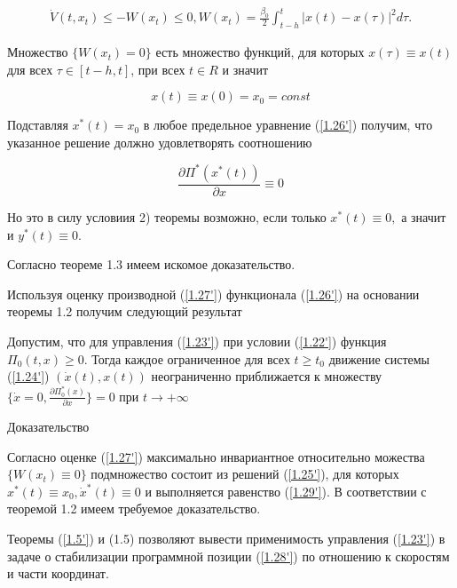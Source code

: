 \begin{equation} \label{1.27'}
	\begin{array}{c}
	\displaystyle \dot V(t, x_t) \le - W(x_t) \le 0, W(x_t) = \frac{\beta_0}{2} \int_{t - h}^{t} \left| x(t) - x(\tau) \right| ^ 2 d \tau.
	\end{array}
\end{equation}

Множество $\{ W(x_t) = 0 \}$ есть множество функций, для которых $x(\tau) \equiv x(t)$ для всех $\tau \in [t - h, t]$, при всех $t \in R$ и значит 

\begin{equation} \label{1.28'}
x(t) \equiv x(0) = x_0 = const
\end{equation}

Подставляя $x^{*}(t) = x_0$ в любое предельное уравнение (\ref{1.26'}) получим, что указанное решение должно удовлетворять соотношению 

\begin{equation} \label{1.29'}
\frac{\partial \Pi^{*} (x^{*} (t))}{\partial x} \equiv 0
\end{equation}

Но это в силу условиия 2) теоремы возможно, если только $x^{*} (t) \equiv 0,$ а значит и $y^{*}(t) \equiv 0.$

Согласно теореме 1.3 имеем искомое доказательство.

Используя оценку производной (\ref{1.27'}) функционала (\ref{1.26'}) на основании теоремы 1.2 получим следующий результат

\begin{theorem}\label{t-1.7}
Допустим, что для управления (\ref{1.23'}) при условии (\ref{1.22'}) функция $\Pi_0 (t, x) \ge 0$. Тогда каждое ограниченное для всех $t \ge t_0$ движение системы (\ref{1.24'}) $(\dot x(t), x(t))$ неограниченно приближается к множеству $ \lbrace \dot x = 0, \frac{\partial \Pi_0^{*} (x)}{\partial x} \rbrace = 0$ при $t \to + \infty$
\end{theorem}

Доказательство

Согласно оценке (\ref{1.27'}) максимально инвариантное относительно можества $\{ W(x_t) \equiv 0 \}$ подмножество состоит из решений (\ref{1.25'}), для которых $x^{*} (t) \equiv x_0, \dot x^{*}(t) \equiv 0$ и выполняется равенство (\ref{1.29'}). В соответствии с теоремой 1.2 имеем требуемое доказательство.

Теоремы (\ref{1.5'}) и (1.5) позволяют вывести применимость управления (\ref{1.23'}) в задаче о стабилизации программной позиции (\ref{1.28'}) по отношению к скоростям и части координат. 

